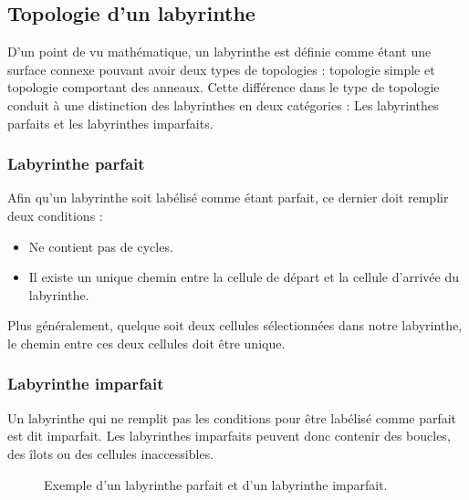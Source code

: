 \subsection{Topologie d'un labyrinthe}
D’un point de vu mathématique, un labyrinthe est définie comme étant une surface connexe pouvant avoir deux types de topologies : topologie simple et topologie comportant des anneaux. Cette différence dans le type de topologie conduit à une distinction des labyrinthes en deux catégories : Les labyrinthes parfaits et les labyrinthes imparfaits.

\subsubsection{Labyrinthe parfait}
Afin qu’un labyrinthe soit labélisé comme étant parfait, ce dernier doit remplir deux conditions :
\begin{itemize}
\item Ne contient pas de cycles.
\item Il existe un unique chemin entre la cellule de départ et la cellule d’arrivée du labyrinthe.
\end{itemize}
Plus généralement, quelque soit deux cellules sélectionnées dans notre labyrinthe, le chemin entre ces deux cellules doit être unique.

\subsubsection{Labyrinthe imparfait}
Un labyrinthe qui ne remplit pas les conditions pour être labélisé comme parfait est dit imparfait. Les labyrinthes imparfaits peuvent donc contenir des boucles, des îlots ou des cellules inaccessibles.


\begin{figure}[htp] 
    \centering
    \hfill%
    \caption{Exemple d'un labyrinthe parfait et d'un labyrinthe imparfait.}
\end{figure}


